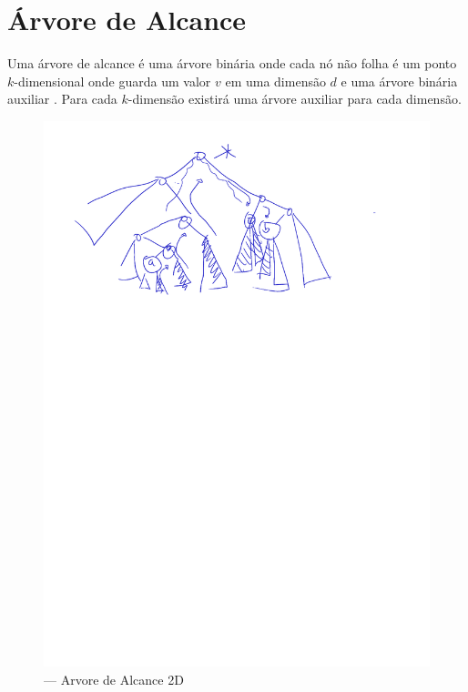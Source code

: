 \section{Árvore de Alcance}

Uma árvore de alcance é  uma árvore binária onde cada nó não folha é um ponto $k$-dimensional
onde guarda um valor $v$ em uma dimensão $d$ e uma árvore binária auxiliar \tau. Para cada $k$-dimensão
existirá uma árvore auxiliar \tau  para cada dimensão.

\begin{figure}[htb]
    \caption{\label{fig:Fig_26} — Arvore de Alcance 2D}
    \begin{center}
        \includegraphics{images/range_tree.pdf}
    \end{center}
\end{figure}

